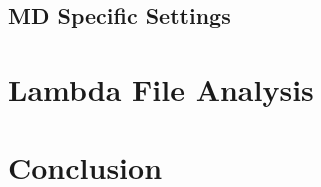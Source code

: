 \documentclass{article}
\begin{document}
\subsection{MD Specific Settings}

\section{Lambda File Analysis}



\section{Conclusion}
\end{document}
